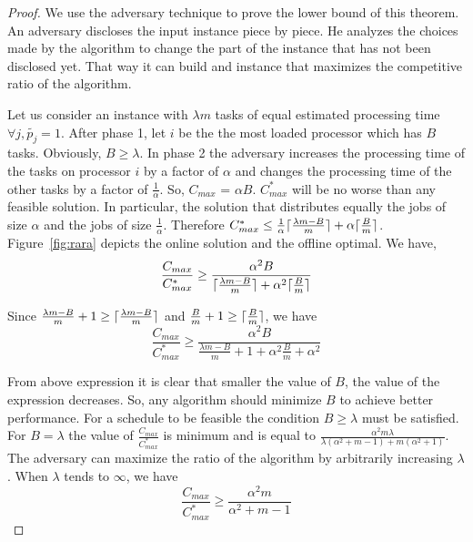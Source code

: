 \documentclass[10pt, conference, compsocconf]{IEEEtran}
\DeclarePairedDelimiter{\ceil}{\lceil}{\rceil}
\begin{document}
\begin{proof}
  We use the adversary technique to prove the lower bound of this
  theorem. An adversary discloses the input instance piece by
  piece. He analyzes the choices made by the algorithm to change the
  part of the instance that has not been disclosed yet. That way it
  can build and instance that maximizes the competitive ratio of the
  algorithm.
 
  Let us consider an instance with $\lambda m$ tasks of equal
  estimated processing time $\forall j, \tilde{p_j} = 1$. After phase
  1, let $i$ be the the most loaded processor which has $B$
  tasks. Obviously, $B \geq \lambda$. In phase 2 the adversary
  increases the processing time of the tasks on processor $i$ by a
  factor of $\alpha$ and changes the processing time of the other
  tasks by a factor of $\frac{1}{\alpha}$. So, $ C_{max}$ = $\alpha
  B$. ${C^{*}_{max}}$ will be no worse than any feasible solution. In
  particular, the solution that distributes equally the jobs of size
  $\alpha$ and the jobs of size $\frac{1}{\alpha}$. Therefore
  ${C^{*}_{max}} \leq \frac{1}{\alpha }\ceil {\frac{\lambda m - B
    }{m}}+ \alpha\ceil{\frac{B}{m}} $.  Figure~\ref{fig:rara} depicts
  the online solution and the offline optimal. We have,
 \begin{equation}\nonumber
   \frac{C_{max}}{C^{*}_{max}}
   \geq \frac{\alpha^{2} B  }{\ceil{\frac{
        \lambda m - B }{m}}+\alpha^2\ceil{\frac{B}{m}}}
 \end{equation}
   
 Since $\frac{ \lambda m - B }{m} +1 \geq\ceil{\frac{ \lambda m - B
   }{m}}$ and $\frac{B}{m}+1\geq\ceil{\frac{B}{m}}$, we have
 \begin{equation}\nonumber
   \frac{C_{max}}{C^{*}_{max}}
   \geq \frac{\alpha^{2} B  }{\frac{
       \lambda m - B }{m}+1+\alpha^2\frac{B}{m}+\alpha^{2}}
 \end{equation}
 
 From above expression it is clear that smaller the value of $B$, the
 value of the expression decreases. So, any algorithm should minimize
 $B$ to achieve better performance.  For a schedule to be feasible the
 condition $B \geq \lambda$ must be satisfied. For $B = \lambda$ the
 value of $\frac{C_{max}}{C^{*}_{max}}$ is minimum and is equal to
 $\frac{\alpha^{2} m \lambda }{\lambda(\alpha^{2}+m-1)+
   m(\alpha^{2}+1)}$. The adversary can maximize the ratio of the
 algorithm by arbitrarily increasing $\lambda$. When $\lambda$ tends
 to $\infty$, we have
 \begin{equation}\nonumber
       \frac{C_{max}}{C^{*}_{max}}
       \geq \frac{\alpha^{2}m  }{\alpha^{2}+m-1}
     \end{equation}
 


\end{proof}
\end{document}
